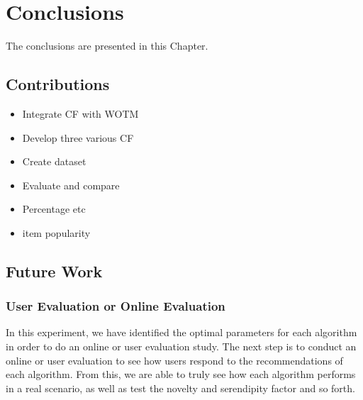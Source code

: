 \chapter{Conclusions}\label{C:con}
The conclusions are presented in this Chapter.

\section{Contributions}
\begin{itemize}
	\item{Integrate CF with WOTM}
	\item{Develop three various CF}
	\item{Create dataset}
	\item{Evaluate and compare}
	\item{Percentage etc}
	\item{item popularity}
\end{itemize}

\section{Future Work}

\subsection{User Evaluation or Online Evaluation}
In this experiment, we have identified the optimal parameters for each algorithm in order to do an online or user evaluation study. The next step is to conduct an online or user evaluation to see how users respond to the recommendations of each algorithm. From this, we are able to truly see how each algorithm performs in a real scenario, as well as test the novelty and serendipity factor and so forth. 

